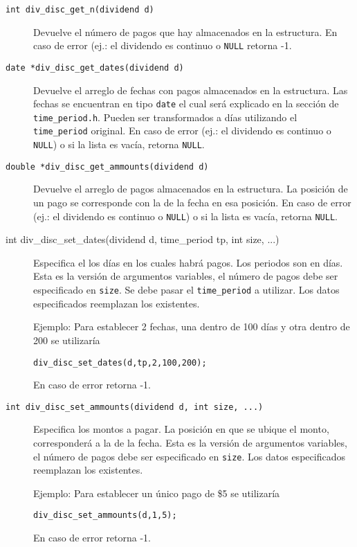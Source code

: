 \documentclass[12pt,a4paper,final]{article}
\begin{document}
\begin{description}
				\item [\texttt{int div\_disc\_get\_n(dividend d)}]
					Devuelve el número de pagos que hay almacenados en la estructura.
					En caso de error (ej.: el dividendo es continuo o \texttt{NULL} retorna -1.
					
				\item [\texttt{date *div\_disc\_get\_dates(dividend d)}]
					Devuelve el arreglo de fechas con pagos almacenados en la estructura.
					Las fechas se encuentran en tipo \texttt{date} el cual será explicado
					en la sección de \texttt{time\_period.h}. Pueden ser transformados a días
					utilizando el \texttt{time\_period} original.
					En caso de error (ej.: el dividendo es continuo o \texttt{NULL}) o si
					la lista es vacía, retorna \texttt{NULL}.
					
				\item [\texttt{double *div\_disc\_get\_ammounts(dividend d)}]
					Devuelve el arreglo de pagos almacenados en la estructura.
					La posición de un pago se corresponde con la de la fecha en esa posición.
					En caso de error (ej.: el dividendo es continuo o \texttt{NULL}) o si
					la lista es vacía, retorna \texttt{NULL}.
					
				\item [int div\_disc\_set\_dates(dividend d, time\_period tp, int size, ...)]
					Especifica el los días en los cuales habrá pagos. Los periodos son en días.
					Esta es la versión de argumentos variables, el número de pagos debe ser especificado
					en \texttt{size}. Se debe pasar el \texttt{time\_period} a utilizar. Los datos 
					especificados reemplazan los existentes.
					
					Ejemplo: Para establecer 2 fechas, una dentro de 100 días y otra dentro de 200
						se utilizaría
						\begin{alltt}
							div_disc_set_dates(d, tp, 2, 100, 200);
						\end{alltt}
					En caso de error retorna -1.
					
				\item [\texttt{int div\_disc\_set\_ammounts(dividend d, int size, ...)}]
					Especifica los montos a pagar. La posición en que se ubique el monto, corresponderá
					a la de la fecha. Esta es la versión de argumentos variables, el número de pagos debe ser
					especificado en \texttt{size}. Los datos especificados reemplazan los existentes.
					
					Ejemplo: Para establecer un único pago de \$5 se utilizaría
						\begin{alltt}
							div_disc_set_ammounts(d, 1, 5);
						\end{alltt}
					En caso de error retorna -1.
					

\end{description}
\end{document}
